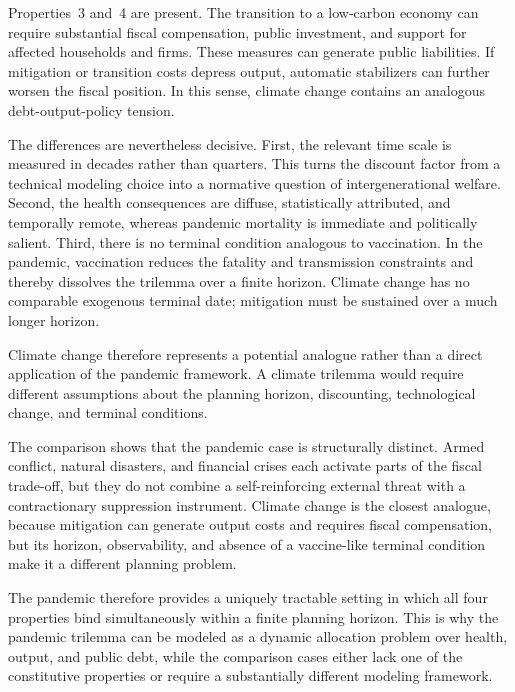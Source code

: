 \documentclass[12pt, a4paper]{article}
\begin{document}
Properties~3 and~4 are present. The transition to a low-carbon economy can require substantial fiscal compensation, public investment, and support for affected households and firms. These measures can generate public liabilities. If mitigation or transition costs depress output, automatic stabilizers can further worsen the fiscal position. In this sense, climate change contains an analogous debt-output-policy tension.

The differences are nevertheless decisive. First, the relevant time scale is measured in decades rather than quarters. This turns the discount factor from a technical modeling choice into a normative question of intergenerational welfare. Second, the health consequences are diffuse, statistically attributed, and temporally remote, whereas pandemic mortality is immediate and politically salient. Third, there is no terminal condition analogous to vaccination. In the pandemic, vaccination reduces the fatality and transmission constraints and thereby dissolves the trilemma over a finite horizon. Climate change has no comparable exogenous terminal date; mitigation must be sustained over a much longer horizon.

Climate change therefore represents a potential analogue rather than a direct application of the pandemic framework. A climate trilemma would require different assumptions about the planning horizon, discounting, technological change, and terminal conditions.

\vspace{5mm}

\noindent The comparison shows that the pandemic case is structurally distinct. Armed conflict, natural disasters, and financial crises each activate parts of the fiscal trade-off, but they do not combine a self-reinforcing external threat with a contractionary suppression instrument. Climate change is the closest analogue, because mitigation can generate output costs and requires fiscal compensation, but its horizon, observability, and absence of a vaccine-like terminal condition make it a different planning problem.

The pandemic therefore provides a uniquely tractable setting in which all four properties bind simultaneously within a finite planning horizon. This is why the pandemic trilemma can be modeled as a dynamic allocation problem over health, output, and public debt, while the comparison cases either lack one of the constitutive properties or require a substantially different modeling framework.
\end{document}
